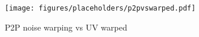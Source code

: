 \begin{figure}
    \centering
      \texttt{[image: figures/placeholders/p2pvswarped.pdf]}
      \caption{P2P noise warping vs UV warped}
      \label{fig:warped}
\end{figure}
